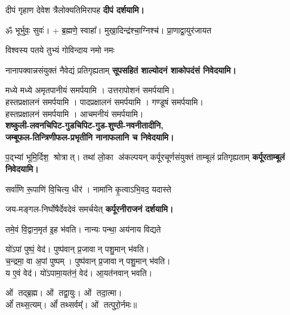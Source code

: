 \begin{center}
{दीपं गृहाण देवेश त्रैलोक्यतिमिरापह}
\textbf{\devAya{} दीपं दर्शयामि।}
\medskip

ॐ भूर्भुवः॒ सुवः॑। + ब्र॒ह्मणे॒ स्वाहा᳚।
{मुखा॒दिन्द्र॑श्चा॒ग्निश्च॑। प्रा॒णाद्वा॒युर॑जायत}


{विश्वस्य पतये तुभ्यं गोविन्दाय नमो नमः}

{नानापक्वान्नसंयुक्तं नैवेद्यं प्रतिगृह्यताम्}
\textbf{\devAya{} सूपसहितं शाल्योदनं शाकोपदंसं निवेदयामि।}

मध्ये मध्ये अमृतपानीयं समर्पयामि । उत्तरापोशनं समर्पयामि।\\
हस्तप्रक्षालनं समर्पयामि । पादप्रक्षालनं समर्पयामि । गण्डूषं समर्पयामि।\\
हस्तप्रक्षालनं समर्पयामि । आचमनीयं समर्पयामि।\\
\textbf{\devAya{} शष्कुली-लवनचिपिट-गुडचिपिट-गुड-शुण्ठी-नवनीतादीनि,\\
जम्बूफल-तिन्त्रिणीफल-प्रभृतीनि नानाफलानि च निवेदयामि।}
\medskip

{प॒द्भ्यां भूमि॒र्दिश॒ श्रोत्रात्। तथा॑ लो॒का अ॑कल्पयन्}
{कर्पूरचूर्णसंयुक्तं ताम्बूलं प्रतिगृह्यताम्}
\textbf{\devAya{} कर्पूरताम्बूलं निवेदयामि।}
\medskip


{सर्वा॑णि रू॒पाणि॑ वि॒चित्य॒ धीर॑। नामा॑नि कृ॒त्वाऽभि॒वद॒\an{} यदास्ते}

{जय-मङ्गल-निर्घोषैर्देवदेवं समर्चयेत्}
\textbf{\devAya{} कर्पूरनीराजनं दर्शयामि।}
\medskip

{तमे॒वं वि॒द्वान॒मृत॑ इ॒ह भ॑वति। नान्यः पन्था॒ अय॑नाय विद्यते}

यो॑ऽपां पुष्पं॒ वेद॑। पुष्प॑वान् प्र॒जावान् पशु॒मान् भ॑वति।\\
च॒न्द्रमा॒ वा अ॒पां पुष्पम्। पुष्प॑वान् प्र॒जावान् पशु॒मान् भ॑वति।\\
य ए॒वं वेद॑। यो॑ऽपामा॒यत॑नं॒ वेद॑। आ॒यत॑नवान् भवति।\medskip

ओं तद्ब्र॒ह्म। ओं तद्वा॒युः। ओं तदा॒त्मा।\\ ओं᳚ तथ्स॒त्यम्।
ओं᳚ तथ्सर्वम्᳚। ओं तत्पुरो॒र्नमः॥\medskip


\end{center}
